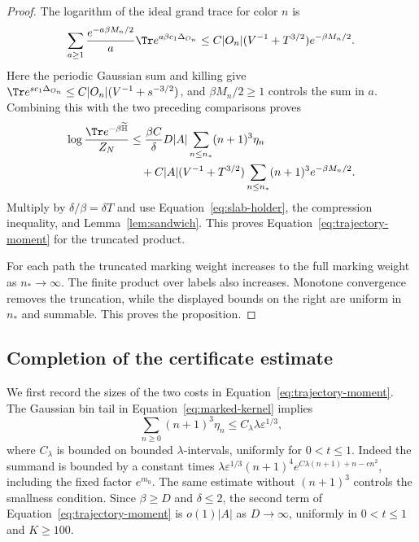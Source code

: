 \begin{proof}
The logarithm of the ideal grand trace for color
$n$ is
\[
 \sum_{a\ge1}\frac{e^{-a\beta M_n/2}}a
                  \Tr e^{a\beta c_1\Delta_{O_n}}
 \le C|O_n|(V^{-1}+T^{3/2})e^{-\beta M_n/2}.
\]
Here the periodic Gaussian sum and killing give
$\Tr e^{s c_1\Delta_{O_n}}
 \le C|O_n|(V^{-1}+s^{-3/2})$,
and $\beta M_n/2\ge1$ controls the sum in $a$.
Combining this with the two preceding comparisons
proves
\begin{align*}
 \log\frac{\Tr e^{-\beta\widetilde{\mathbb H}}}{Z_N}
 &\le\frac{\beta C}{\delta}D|A|
                      \sum_{n\le n_*}(n+1)^3\eta_n\\
 &\quad+C|A|(V^{-1}+T^{3/2})
                      \sum_{n\le n_*}(n+1)^3e^{-\beta M_n/2}.
\end{align*}
Multiply by $\delta/\beta=\delta T$ and use
Equation~\eqref{eq:slab-holder}, the compression
inequality, and Lemma~\ref{lem:sandwich}.
This proves Equation~\eqref{eq:trajectory-moment}
for the truncated product.

For each path the truncated marking weight increases
to the full marking weight as $n_*\to\infty$.
The finite product over labels also increases.
Monotone convergence removes the truncation, while
the displayed bounds on the right are uniform in
$n_*$ and summable.  This proves the proposition.
\end{proof}

\subsection{Completion of the certificate estimate}

We first record the sizes of the two costs in
Equation~\eqref{eq:trajectory-moment}.  The Gaussian
bin tail in Equation~\eqref{eq:marked-kernel} implies
\begin{equation}\label{eq:eta-sum}
 \sum_{n\ge0}(n+1)^3\eta_n
 \le C_\lambda\lambda\varepsilon^{1/3},
\end{equation}
where $C_\lambda$ is bounded on bounded
$\lambda$-intervals, uniformly for $0<t\le1$.
Indeed the summand is bounded by a constant times
$\lambda\varepsilon^{1/3}(n+1)^4
 e^{C\lambda(n+1)+n-cn^2}$, including the fixed
factor $e^{m_0}$.  The same estimate without
$(n+1)^3$ controls the smallness condition.
Since $\beta\ge D$ and $\delta\le2$, the second
term of Equation~\eqref{eq:trajectory-moment} is
$o(1)|A|$ as $D\to\infty$, uniformly in
$0<t\le1$ and $K\ge100$.

